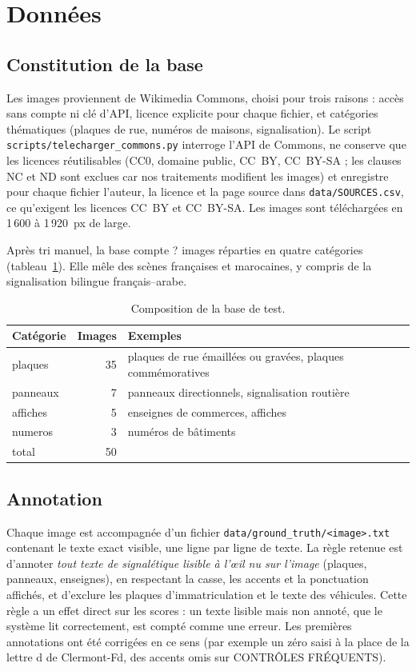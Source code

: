 \documentclass[11pt,a4paper]{article}
\newcommand{\nbImages}{?}\newcommand{\configFinale}{?}\newcommand{\baseFmed}{?}%
\newcommand{\fichier}[1]{\texttt{#1}}
\begin{document}
\section{Données}

\subsection{Constitution de la base}
Les images proviennent de Wikimedia Commons, choisi pour trois raisons : accès sans compte ni clé d'API, licence explicite pour chaque fichier, et catégories thématiques (plaques de rue, numéros de maisons, signalisation). Le script \fichier{scripts/telecharger\_commons.py} interroge l'API de Commons, ne conserve que les licences réutilisables (CC0, domaine public, CC~BY, CC~BY-SA ; les clauses NC et ND sont exclues car nos traitements modifient les images) et enregistre pour chaque fichier l'auteur, la licence et la page source dans \fichier{data/SOURCES.csv}, ce qu'exigent les licences CC~BY et CC~BY-SA. Les images sont téléchargées en 1\,600 à 1\,920~px de large.

Après tri manuel, la base compte \nbImages{} images réparties en quatre catégories (tableau~\ref{tab:base}). Elle mêle des scènes françaises et marocaines, y compris de la signalisation bilingue français--arabe.

\begin{table}[htbp]
\centering\small
\begin{tabular}{lrl}
\toprule
Catégorie & Images & Exemples \\
\midrule
plaques & 35 & plaques de rue émaillées ou gravées, plaques commémoratives \\
panneaux & 7 & panneaux directionnels, signalisation routière \\
affiches & 5 & enseignes de commerces, affiches \\
numeros & 3 & numéros de bâtiments \\
\midrule
total & 50 & \\
\bottomrule
\end{tabular}
\caption{Composition de la base de test.}
\label{tab:base}
\end{table}

\subsection{Annotation}
Chaque image est accompagnée d'un fichier \fichier{data/ground\_truth/<image>.txt} contenant le texte exact visible, une ligne par ligne de texte. La règle retenue est d'annoter \emph{tout texte de signalétique lisible à l'œil nu sur l'image} (plaques, panneaux, enseignes), en respectant la casse, les accents et la ponctuation affichés, et d'exclure les plaques d'immatriculation et le texte des véhicules. Cette règle a un effet direct sur les scores : un texte lisible mais non annoté, que le système lit correctement, est compté comme une erreur. Les premières annotations ont été corrigées en ce sens (par exemple un zéro saisi à la place de la lettre \og d\fg{} de \og Clermont-Fd\fg{}, des accents omis sur \og CONTRÔLES FRÉQUENTS\fg).
\end{document}
